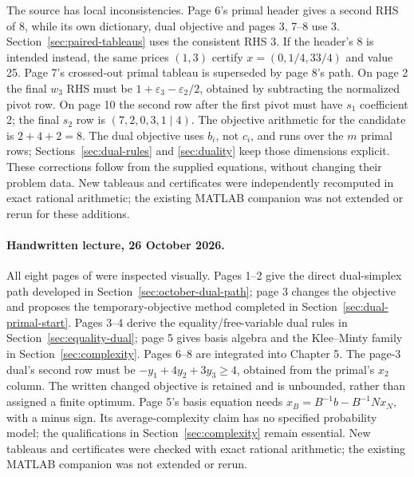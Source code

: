 \documentclass[11pt,a4paper]{article}
\begin{document}
The source has local inconsistencies. Page 6's primal header gives a second
RHS of 8, while its own dictionary, dual objective and pages 3, 7--8 use 3.
Section~\ref{sec:paired-tableaus} uses the consistent RHS 3. If the header's
8 is intended instead, the same prices $(1,3)$ certify
$x=(0,1/4,33/4)$ and value 25. Page 7's crossed-out primal tableau is superseded
by page 8's path. On page 2 the final $w_3$ RHS must be
$1+\varepsilon_3-\varepsilon_2/2$, obtained by subtracting the normalized
pivot row. On page 10 the second row after the first pivot must have $s_1$
coefficient 2; the final $s_2$ row is $(7,2,0,3,1\mid4)$.
The objective arithmetic for the candidate is $2+4+2=8$.
The dual objective uses $b_i$, not $c_i$, and runs over the $m$ primal rows;
Sections~\ref{sec:dual-rules} and \ref{sec:duality} keep those dimensions explicit.
These corrections follow from the supplied equations, without changing their
problem data. New tableaus and certificates were independently recomputed in
exact rational arithmetic; the existing MATLAB companion was not extended or
rerun for these additions.

\paragraph{Handwritten lecture, 26 October 2026.}
All eight pages of  were
inspected visually. Pages 1--2 give the direct dual-simplex path developed in
Section~\ref{sec:october-dual-path}; page 3 changes the objective and proposes
the temporary-objective method completed in Section~\ref{sec:dual-primal-start}.
Pages 3--4 derive the equality/free-variable dual rules in
Section~\ref{sec:equality-dual}; page 5 gives basis algebra and the Klee--Minty
family in Section~\ref{sec:complexity}. Pages 6--8 are integrated into Chapter 5.
The page-3 dual's second row must be $-y_1+4y_2+3y_3\geq4$, obtained from
the primal's $x_2$ column. The written changed objective is retained and is
unbounded, rather than assigned a finite optimum. Page 5's basis equation needs
$x_B=B^{-1}b-B^{-1}Nx_N$, with a minus sign. Its average-complexity claim has
no specified probability model; the qualifications in Section~\ref{sec:complexity}
remain essential. New tableaus and certificates were checked with exact rational
arithmetic; the existing MATLAB companion was not extended or rerun.
\end{document}
